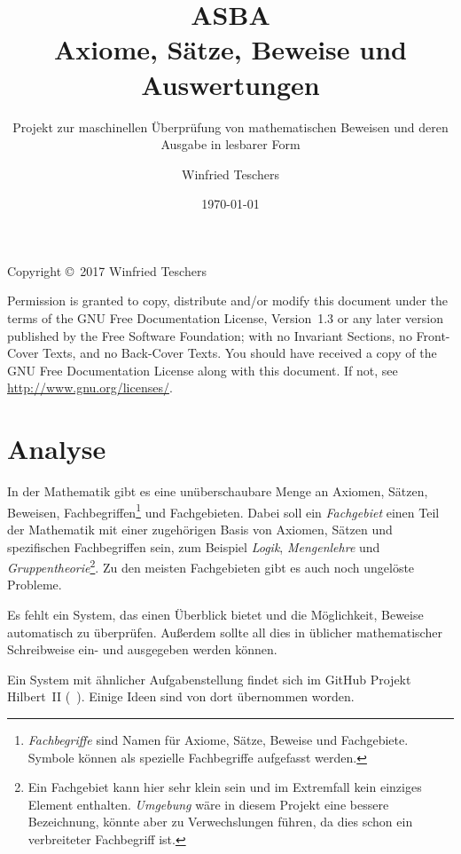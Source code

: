 \documentclass[english,ngerman,parskip=half,headsepline,footsepline]{scrreprt}
\title{{\Huge ASBA}\\Axiome, Sätze, Beweise und Auswertungen}
\subtitle{Projekt zur maschinellen Überprüfung von mathematischen Beweisen und deren Ausgabe in lesbarer Form}
\author{Winfried Teschers}
\date{\today}
\begin{document}
	\maketitle

	\tableofcontents
	\ihead{\textnormal{\textsf{\textbf{\contentsname}}}}
	\thispagestyle{scrheadings}

	\vfill
	Copyright \copyright\ 2017 Winfried Teschers

	\bigskip
	Permission is granted to copy, distribute and/or modify this document under the terms of the GNU Free Documentation License, Version~1.3 or any later version published by the Free Software Foundation; with no Invariant Sections, no Front-Cover Texts, and no Back-Cover Texts. You should have received a copy of the GNU Free Documentation License along with this document.  If not, see \url{http://www.gnu.org/licenses/}.

	\chapter{Analyse} %

	\ihead{\textnormal{\textsf{\textbf{\chaptername~\thesection}}}}
	\thispagestyle{scrheadings}

	In der Mathematik gibt es eine unüberschaubare Menge an Axiomen, Sätzen, Beweisen, Fachbegriffen\footnote{ \emph{Fachbegriffe} sind Namen für Axiome, Sätze, Beweise und Fachgebiete. Symbole können als spezielle Fachbegriffe aufgefasst werden.} und Fachgebieten. Dabei soll ein \emph{Fachgebiet} einen Teil der Mathematik  mit einer zugehörigen Basis von Axiomen, Sätzen und spezifischen Fachbegriffen sein, zum Beispiel \emph{Logik}, \emph{Mengenlehre} und \emph{Gruppentheorie}\footnote{ Ein Fachgebiet kann hier sehr klein sein und im Extremfall kein einziges Element enthalten. \emph{Umgebung} wäre in diesem Projekt eine bessere Bezeichnung, könnte aber zu Verwechslungen führen, da dies schon ein verbreiteter Fachbegriff ist.}. Zu den meisten Fachgebieten gibt es auch noch ungelöste Probleme.

	Es fehlt ein System, das einen Überblick bietet und die Möglichkeit, Beweise automatisch zu überprüfen. Außerdem sollte all dies in üblicher mathematischer Schreibweise ein- und ausgegeben werden können.

	Ein System mit ähnlicher Aufgabenstellung findet sich im GitHub Projekt Hilbert~II (\seename~\cite{bib:HilbertII, bib:qedeq}). Einige Ideen sind von dort übernommen worden.
\end{document}
